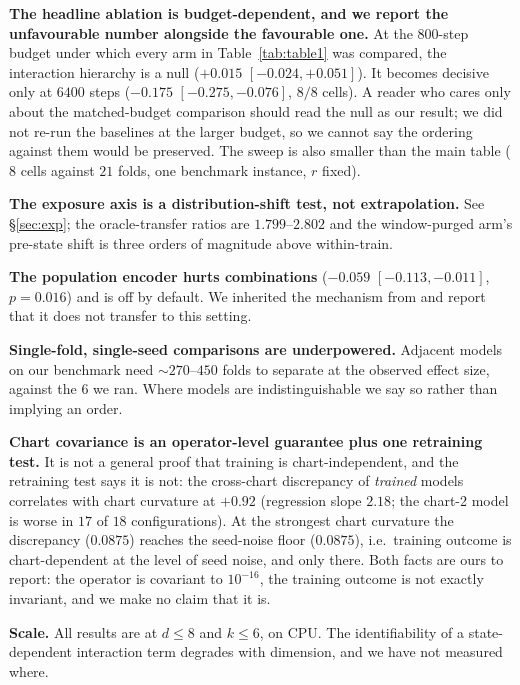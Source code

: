 \documentclass{article}
\newcommand{\tabonelabel}{tab:table1}
\newcommand{\ie}{i.e.\ }
\begin{document}
\textbf{The headline ablation is budget-dependent, and we report the unfavourable number
alongside the favourable one.} At the $800$-step budget under which every arm in
Table~\ref{\tabonelabel} was compared, the interaction hierarchy is a null
($+0.015$ $[-0.024, +0.051]$). It becomes decisive only at $6400$ steps
($-0.175$ $[-0.275, -0.076]$, $8/8$ cells). A reader who cares only about the matched-budget
comparison should read the null as our result; we did not re-run the baselines at the larger
budget, so we cannot say the ordering against them would be preserved. The sweep is also
smaller than the main table ($8$ cells against $21$ folds, one benchmark instance,
$r$ fixed).

\textbf{The exposure axis is a distribution-shift test, not extrapolation.} See
\S\ref{sec:exp}; the oracle-transfer ratios are $1.799$--$2.802$ and the window-purged arm's
pre-state shift is three orders of magnitude above within-train.

\textbf{The population encoder hurts combinations} ($-0.059$ $[-0.113, -0.011]$, $p = 0.016$)
and is off by default. We inherited the mechanism from \citet{atanackovic2024mfm} and report
that it does not transfer to this setting.

\textbf{Single-fold, single-seed comparisons are underpowered.} Adjacent models on our
benchmark need $\sim\!270$--$450$ folds to separate at the observed effect size, against the
$6$ we ran. Where models are indistinguishable we say so rather than implying an order.

\textbf{Chart covariance is an operator-level guarantee plus one retraining test.} It is not
a general proof that training is chart-independent, and the retraining test says it is not:
the cross-chart discrepancy of \emph{trained} models correlates with chart curvature at
$+0.92$ (regression slope $2.18$; the chart-2 model is worse in $17$ of $18$ configurations).
At the strongest chart curvature the discrepancy ($0.0875$) reaches the seed-noise floor
($0.0875$), \ie training outcome is chart-dependent at the level of seed noise, and only
there. Both facts are ours to report: the operator is covariant to $10^{-16}$, the training
outcome is not exactly invariant, and we make no claim that it is.

\textbf{Scale.} All results are at $d \le 8$ and $k \le 6$, on CPU. The identifiability of a
state-dependent interaction term degrades with dimension, and we have not measured where.

\appendix
\end{document}
